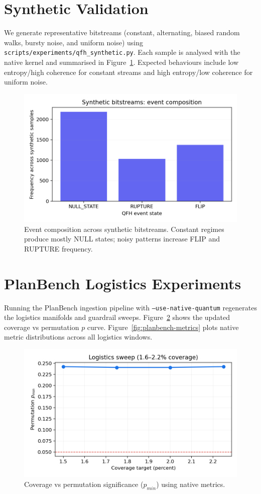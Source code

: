 \documentclass[11pt]{article}
\begin{document}
\section{Synthetic Validation}
We generate representative bitstreams (constant, alternating, biased random walks, bursty noise, and uniform noise) using \texttt{scripts/experiments/qfh\_synthetic.py}. Each sample is analysed with the native kernel and summarised in Figure~\ref{fig:synthetic-events}. Expected behaviours include low entropy/high coherence for constant streams and high entropy/low coherence for uniform noise.

\begin{figure}[t]
  \centering
  \includegraphics[width=0.75\linewidth]{../figures/fig0_synthetic_event_hist.png}
  \caption{Event composition across synthetic bitstreams. Constant regimes produce mostly NULL states; noisy patterns increase FLIP and RUPTURE frequency.}
  \label{fig:synthetic-events}
\end{figure}

\section{PlanBench Logistics Experiments}
Running the PlanBench ingestion pipeline with \texttt{--use-native-quantum} regenerates the logistics manifolds and guardrail sweeps. Figure~\ref{fig:logistics-sweep} shows the updated coverage vs permutation $p$ curve. Figure~\ref{fig:planbench-metrics} plots native metric distributions across all logistics windows.

\begin{figure}[t]
  \centering
  \includegraphics[width=0.75\linewidth]{../figures/fig1_logistics_sweep.png}
  \caption{Coverage vs permutation significance ($p_{min}$) using native metrics.}
  \label{fig:logistics-sweep}
\end{figure}
\end{document}
